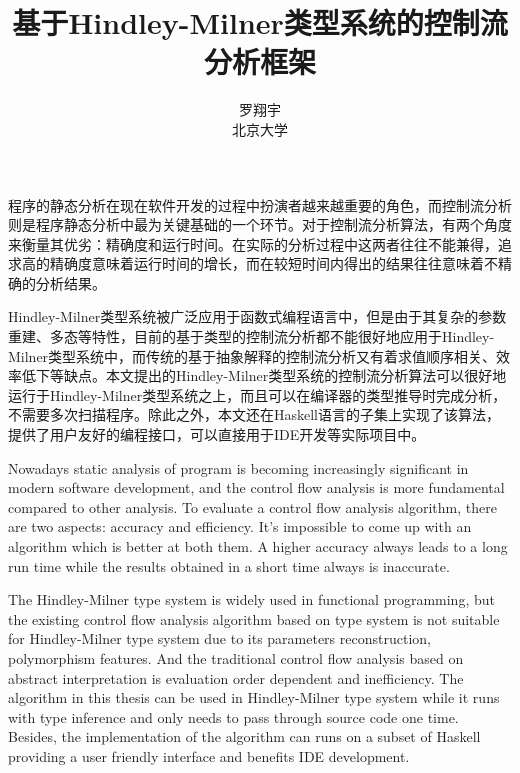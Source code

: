 \documentclass[UTF8, colorlinks]{pkuthss}
\title{基于Hindley-Milner类型系统的控制流分析框架}
\author{罗翔宇\\北京大学}
\begin{document}
	\frontmatter
	\maketitle
	
	
	
	\begin{cabstract}
	
	程序的静态分析在现在软件开发的过程中扮演者越来越重要的角色，而控制流分析则是程序静态分析中最为关键基础的一个环节。对于控制流分析算法，有两个角度来衡量其优劣：精确度和运行时间。在实际的分析过程中这两者往往不能兼得，追求高的精确度意味着运行时间的增长，而在较短时间内得出的结果往往意味着不精确的分析结果。
	
	Hindley-Milner类型系统被广泛应用于函数式编程语言中，但是由于其复杂的参数重建、多态等特性，目前的基于类型的控制流分析都不能很好地应用于Hindley-Milner类型系统中，而传统的基于抽象解释的控制流分析又有着求值顺序相关、效率低下等缺点。本文提出的Hindley-Milner类型系统的控制流分析算法可以很好地运行于Hindley-Milner类型系统之上，而且可以在编译器的类型推导时完成分析，不需要多次扫描程序。除此之外，本文还在Haskell语言的子集上实现了该算法，提供了用户友好的编程接口，可以直接用于IDE开发等实际项目中。
	\end{cabstract}
	
	\begin{eabstract}
	
	Nowadays static analysis of program is becoming increasingly significant in modern software development, and the control flow analysis is more fundamental compared to other analysis. To evaluate a control flow analysis algorithm, there are two aspects: accuracy and efficiency. It's impossible to come up with an algorithm which is better at both them. A higher accuracy always leads to a long run time while the results obtained in a short time always is inaccurate.
	
 	The Hindley-Milner type system is widely used in functional programming, but the existing control flow analysis algorithm based on type system is not suitable for Hindley-Milner type system due to its parameters reconstruction, polymorphism features. And the traditional control flow analysis based on abstract interpretation is evaluation order dependent and inefficiency. The algorithm in this thesis can be used in Hindley-Milner type system while it runs with type inference and only needs to pass through source code one time. Besides, the implementation of the algorithm can runs on a subset of Haskell providing a user friendly interface and benefits IDE development.
	\end{eabstract}
	\tableofcontents
	\mainmatter
	
\end{document}
